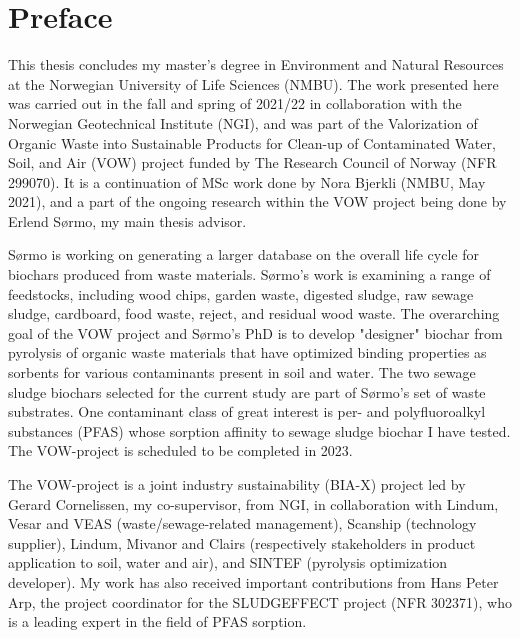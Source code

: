 \newpage
{}
\section*{Preface}
This thesis concludes my master's degree in Environment and Natural Resources at the Norwegian University of Life Sciences (NMBU). The work presented here was carried out in the fall and spring of 2021/22 in collaboration with the Norwegian Geotechnical Institute (\acrshort{NGI}), and was part of the Valorization of Organic Waste into Sustainable Products for Clean-up of Contaminated Water, Soil, and Air (\acrshort{VOW}) project funded by The Research Council of Norway (NFR 299070). It is a continuation of MSc work done by Nora Bjerkli (NMBU, May 2021), and a part of the ongoing research within the VOW project being done by Erlend S\o rmo, my main thesis advisor. 

S\o rmo is working on generating a larger database on the overall life cycle for biochars produced from waste materials. S\o rmo's work is examining a range of feedstocks, including wood chips, garden waste, digested sludge, raw sewage sludge, cardboard, food waste, reject, and residual wood waste. The overarching goal of the VOW project and S\o rmo's PhD is to develop "designer" biochar from pyrolysis of organic waste materials that have optimized binding properties as sorbents for various contaminants present in soil and water. The two sewage sludge biochars selected for the current study are part of S\o rmo's set of waste substrates. One contaminant class of great interest is per- and polyfluoroalkyl substances (PFAS) whose sorption affinity to sewage sludge biochar I have tested. The VOW-project is scheduled to be completed in 2023.

The VOW-project is a joint industry sustainability (BIA-X) project led by Gerard Cornelissen, my co-supervisor, from NGI, in collaboration with Lindum, Vesar and VEAS (waste/sewage-related management), Scanship (technology supplier), Lindum, Mivanor and Clairs (respectively stakeholders in product application to soil, water and air), and SINTEF (pyrolysis optimization developer). My work has also received important contributions from Hans Peter Arp, the project coordinator for the SLUDGEFFECT project (NFR 302371), who is a leading expert in the field of PFAS sorption.

